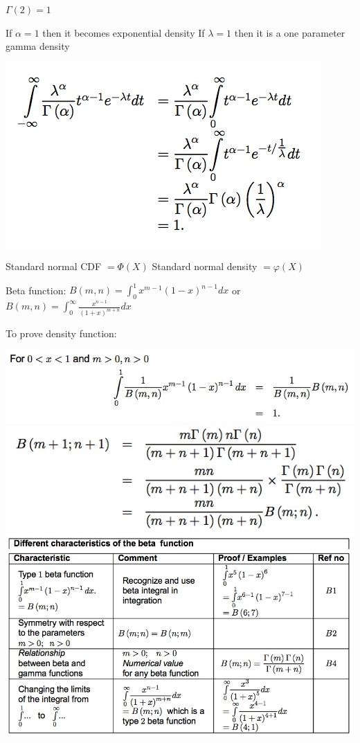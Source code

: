 \documentclass{/out/app/latex/examnotes}
\begin{document}
{$\Gamma(2) = 1$ \vspace{6pt}

If $\alpha=1$ then it becomes exponential density
If $\lambda=1$ then it is a one parameter gamma density


\includegraphics[scale=0.4]{./img/2gam.jpg}


\ra Standard normal CDF $= \Phi(X)$ 
\ra Standard normal density $= \varphi(X)$


Beta function: $B(m,n)=\displaystyle\int_0^1{x^{m-1}(1-x)^{n-1}dx}$ \quad or $B(m,n)=\displaystyle\int_0^\infty{\frac{x^{n-1}}{(1+x)^{m+n}}dx}$

To prove density function:

\includegraphics[scale=0.4]{./img/2bet2.jpg}
\includegraphics[scale=0.4]{./img/2bet3.jpg}
\includegraphics[scale=0.5]{./img/2bet1.jpg}

}
\end{document}
